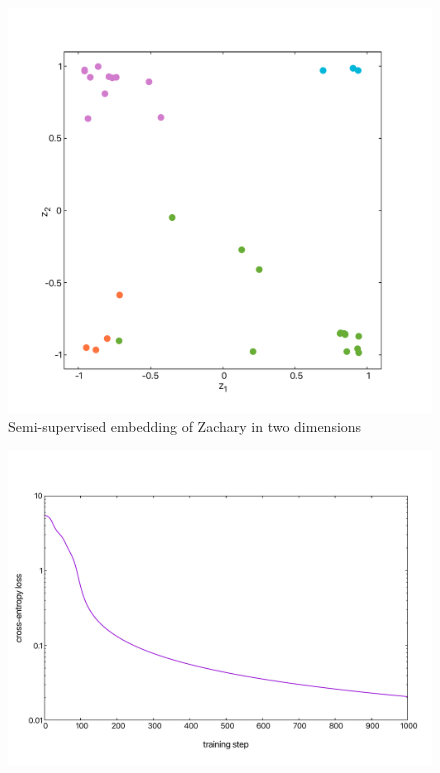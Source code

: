 \documentclass[mathserif,10pt]{beamer}
\begin{document}
\begin{frame}
  \begin{figure}
    \includegraphics[scale=0.30]{figs/fig02c.pdf}
    \caption{Semi-supervised embedding of Zachary in two dimensions}
  \end{figure}
\end{frame}
  
\begin{frame}
  \begin{figure}
    \includegraphics[scale=0.35]{figs/fig02b.pdf}
  \end{figure}
\end{frame}
\end{document}
